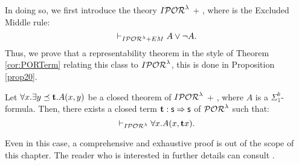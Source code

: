 {%
%
%
%
%
%
%
%
%
%
%
%
%
%
%
%
%
%
%
%
%
%
%
%
%
%
%
%
In doing so, we first introduce the theory
$I\mathcal{POR}^\lambda$ + \EM, where \EM{} is the Excluded Middle rule:
$$
\vdash_{I\mathcal{POR}^\lambda + EM} A \lor \lnot A.
$$
Thus, we prove that a representability theorem
in the style of Theorem \ref{cor:PORTerm} relating this
class to $I\mathcal{POR}^\lambda$, this is done in Proposition \ref{prop20}.


\begin{prop}\label{prop20}
Let $\forall x.\exists y\preceq {\mathbf t}. A(x,y)$
be a closed theorem of $I\mathcal{POR}^\lambda$ + \EM,
where $A$ is a $\Sigma^b_1$-formula.
Then, there exists a closed term
${\mathbf t}:\mathsf{s}\Rightarrow \mathsf{s}$ of $\mathcal{POR}^\lambda$ such that:
$$
\vdash_{I\mathcal{POR}^\lambda} \forall x.A(x,{\mathbf t} x).
$$
\end{prop}
\noindent
Even in this case, a comprehensive and exhaustive proof is out of the scope of this chapter. The reader who is interested in further details can consult \cite{RBA}.


}
